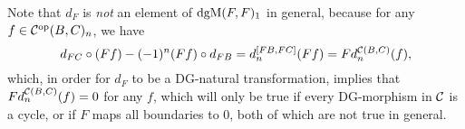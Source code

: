 Note that \( d_F \) is \emph{not} an element of \( \operatorname{dgM}(F, F)_1 \) in general, because for any \( f \in {\mathcal{C}}^{\operatorname{op}}(B, C)_n \), we have
\[
    d_{F C} \circ (F f) - (-1)^n (F f) \circ d_{F B} = d_n^{[F B, F C]}(F f) = F d_n^{{\mathcal{C}}(B, C)} (f),
\]
which, in order for \( d_F \) to be a DG-natural transformation, implies that \( F d_n^{{\mathcal{C}}(B, C)} (f) = 0 \) for any \( f \), which will only be true if every DG-morphism in \( {\mathcal{C}} \) is a cycle, or if \( F \) maps all boundaries to \( 0 \), both of which are not true in general.